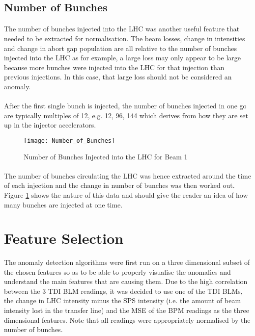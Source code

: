 \subsection{Number of Bunches}
\paragraph{ }The number of bunches injected into the \acs{LHC} was another useful feature that needed to be extracted for normalisation. The beam losses, change in intensities and change in abort gap population are all relative to the number of bunches injected into the \acs{LHC} as for example, a large loss may only appear to be large because more bunches were injected into the LHC for that injection than previous injections. In this case, that large loss should not be considered an anomaly. 

\paragraph{ }After the first single bunch is injected, the number of bunches injected in one go are typically multiples of 12, e.g. 12, 96, 144 which derives from how they are set up in the injector accelerators.

\begin{figure}[t]
	\centering
	\texttt{[image: Number\_of\_Bunches]}
	\caption[Number of Bunches]{Number of Bunches Injected into the LHC for Beam 1}
	\label{fig::Number_of_Bunches}
\end{figure} 

\paragraph{ }The number of bunches circulating the \acs{LHC} was hence extracted around the time of each injection and the change in number of bunches was then worked out. Figure \ref{fig::Number_of_Bunches} shows the nature of this data and should give the reader an idea of how many bunches are injected at one time.

\section{Feature Selection}
\label{sec::FeatureSelection}

\paragraph{ }The anomaly detection algorithms were first run on a three dimensional subset of the chosen features so as to be able to properly visualise the anomalies and understand the main features that are causing them. Due to the
high correlation between the 3 TDI BLM readings, it was decided to use one of the \acs{TDI} \acs{BLM}s, the change in \acs{LHC} intensity minus the \acs{SPS} intensity (i.e. the amount of beam intensity lost in the transfer line) and the \acs{MSE} of the \acs{BPM} readings as the three dimensional features. Note that all readings were appropriately normalised by the number of bunches.

